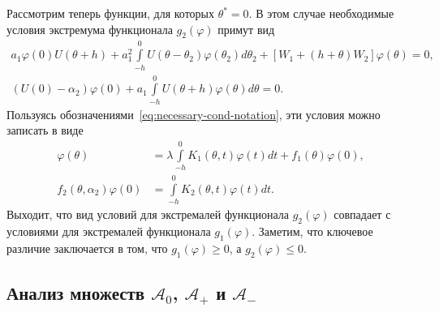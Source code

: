 \documentclass[a4paper,14pt]{article}
\theoremstyle{definition}
\begin{document}
Рассмотрим теперь функции, для которых $\theta^* = 0$. В этом случае необходимые
условия экстремума функционала $g_2(\varphi)$ примут вид
\begin{equation*}
  \begin{aligned}
  a_1 \varphi(0)
  U(\theta + h)
  +
  a_1^2
  \int\limits_{-h}^{0}
  U(\theta - \theta_2) \varphi(\theta_2)
  d\theta_2
  +
  \left[ W_1 + (h + \theta) W_2 \right] \varphi(\theta)
  = 0, \\
  (U(0) - \alpha_2) \varphi(0)
  +
  a_1
  \int\limits_{-h}^{0} U(\theta + h) \varphi(\theta) d\theta
    = 0.
  \end{aligned}
\end{equation*}
Пользуясь обозначениями~\eqref{eq:necessary-cond-notation}, эти условия можно записать
в виде
\begin{equation*}
  \begin{aligned}
    \varphi(\theta)
    &=
      \lambda
      \int\limits_{-h}^{0}
      K_1(\theta, t)
      \varphi(t)
      dt
      + f_1(\theta) \varphi(0), \\
    f_2(\theta, \alpha_2) \varphi(0)
    &=
      \int\limits_{-h}^{0}
      K_2(\theta, t)
      \varphi(t)
      dt.
  \end{aligned}
\end{equation*}
Выходит, что вид условий для экстремалей функционала $g_2(\varphi)$ совпадает с условиями для
экстремалей функционала $g_1(\varphi)$. Заметим, что ключевое различие заключается
в том, что $g_1(\varphi) \geqslant 0$, а $g_2(\varphi) \leqslant 0$.

\subsection{Анализ множеств $\mathcal{A}_0$, $\mathcal{A}_+$ и $\mathcal{A}_-$}
\end{document}
